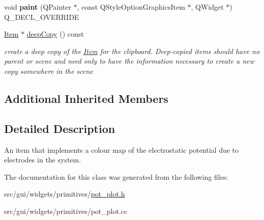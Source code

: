 \begin{DoxyCompactItemize}
\item 
void {\bfseries paint} (Q\+Painter $\ast$, const Q\+Style\+Option\+Graphics\+Item $\ast$, Q\+Widget $\ast$) Q\+\_\+\+D\+E\+C\+L\+\_\+\+O\+V\+E\+R\+R\+I\+DE\hypertarget{classprim_1_1PotPlot_a8f9e7c42583b8922c5997f608490f19d}{}\label{classprim_1_1PotPlot_a8f9e7c42583b8922c5997f608490f19d}

\item 
\hyperlink{classprim_1_1Item}{Item} $\ast$ \hyperlink{classprim_1_1PotPlot_ac0db79264ed87062bc48ee790f6f2105}{deep\+Copy} () const \hypertarget{classprim_1_1PotPlot_ac0db79264ed87062bc48ee790f6f2105}{}\label{classprim_1_1PotPlot_ac0db79264ed87062bc48ee790f6f2105}

\begin{DoxyCompactList}\small\item\em create a deep copy of the \hyperlink{classprim_1_1Item}{Item} for the clipboard. Deep-\/copied items should have no parent or scene and need only to have the information necessary to create a new copy somewhere in the scene \end{DoxyCompactList}\end{DoxyCompactItemize}
\subsection*{Additional Inherited Members}


\subsection{Detailed Description}
An item that implements a colour map of the electrostatic potential due to electrodes in the system. 

The documentation for this class was generated from the following files\+:\begin{DoxyCompactItemize}
\item 
src/gui/widgets/primitives/\hyperlink{pot__plot_8h}{pot\+\_\+plot.\+h}\item 
src/gui/widgets/primitives/pot\+\_\+plot.\+cc\end{DoxyCompactItemize}
